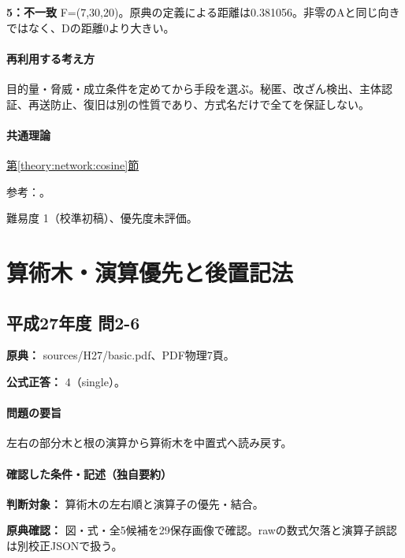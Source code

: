 \noindent\textbf{5：不一致} F=\allowbreak{}(7,30,20)。原典の定義による距離は0.381056。非零のAと同じ向きではなく、Dの距離0より大きい。\par

\paragraph{再利用する考え方} 目的量・脅威・成立条件を定めてから手段を選ぶ。秘匿、改ざん検出、主体認証、再送防止、復旧は別の性質であり、方式名だけで全てを保証しない。

\paragraph{共通理論} \hyperref[theory:network:cosine]{第\ref*{theory:network:cosine}節}

\par 参考：\cite{net_cosine}。

\par 難易度 1（校準初稿）、優先度未評価。

\section{算術木・演算優先と後置記法}

\subsection{平成27年度 問2-6}
\label{q:h27-reg-basic-2-6}

\noindent\textbf{原典：} sources/H27/basic.pdf、PDF物理7頁。

\textbf{公式正答：} 4（single）。

\paragraph{問題の要旨} 左右の部分木と根の演算から算術木を中置式へ読み戻す。

\paragraph{確認した条件・記述（独自要約）}\mbox{}\par

\noindent\textbf{判断対象：} 算術木の左右順と演算子の優先・結合。\par

\noindent\textbf{原典確認：} 図・式・全5候補を29保存画像で確認。rawの数式欠落と演算子誤認は別校正JSONで扱う。\par

